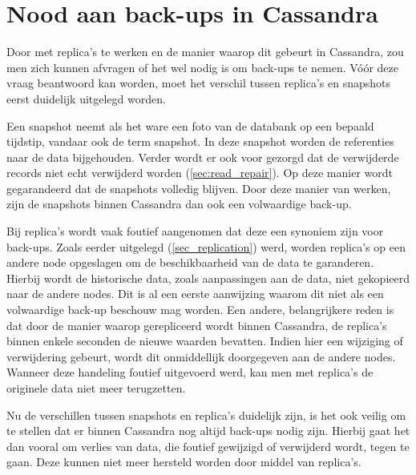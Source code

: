 \section{Nood aan back-ups in Cassandra}
Door met replica's te werken en de manier waarop dit gebeurt in Cassandra, zou men zich kunnen afvragen of het wel nodig is om back-ups te nemen.
Vóór deze vraag beantwoord kan worden, moet het verschil tussen replica's en snapshots eerst duidelijk uitgelegd worden.

Een snapshot neemt als het ware een foto van de databank op een bepaald tijdstip, vandaar ook de term snapshot.
In deze snapshot worden de referenties naar de data bijgehouden.
Verder wordt er ook voor gezorgd dat de verwijderde records niet echt verwijderd worden (\ref{sec:read_repair}).
Op deze manier wordt gegarandeerd dat de snapshots volledig blijven.
Door deze manier van werken, zijn de snapshots binnen Cassandra dan ook een volwaardige back-up.

Bij replica's wordt vaak foutief aangenomen dat deze een synoniem zijn voor back-ups.
Zoals eerder uitgelegd (\ref{sec_replication}) werd, worden replica's op een andere node opgeslagen om de beschikbaarheid van de data te garanderen.
Hierbij wordt de historische data, zoals aanpassingen aan de data, niet gekopieerd naar de andere nodes.
Dit is al een eerste aanwijzing waarom dit niet als een volwaardige back-up beschouw mag worden.
Een andere, belangrijkere reden is dat door de manier waarop gerepliceerd wordt binnen Cassandra, de replica's binnen enkele seconden de nieuwe waarden bevatten.
Indien hier een wijziging of verwijdering gebeurt, wordt dit onmiddellijk doorgegeven aan de andere nodes.
Wanneer deze handeling foutief uitgevoerd werd, kan men met replica's de originele data niet meer terugzetten.

Nu de verschillen tussen snapshots en replica's duidelijk zijn, is het ook veilig om te stellen dat er binnen Cassandra nog altijd back-ups nodig zijn.
Hierbij gaat het dan vooral om verlies van data, die foutief gewijzigd of verwijderd wordt, tegen te gaan.
Deze kunnen niet meer hersteld worden door middel van replica's.